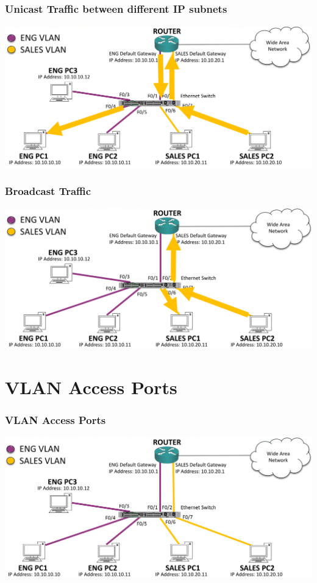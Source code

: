 \documentclass[pdflatex,compress,mathserif]{beamer}
\begin{document}
\begin{frame}
	\frametitle{Unicast Traffic between different IP subnets}
	\begin{center}
		\includegraphics[width=\linewidth]{img/img16}
	\end{center}
\end{frame}

\begin{frame}
	\frametitle{Broadcast Traffic}
	\begin{center}
		\includegraphics[width=\linewidth]{img/img17}
	\end{center}
\end{frame}

\section{VLAN Access Ports}

\begin{frame}
	\frametitle{VLAN Access Ports}
	\begin{center}
		\includegraphics[width=\linewidth]{img/img18}
	\end{center}
\end{frame}
\end{document}
